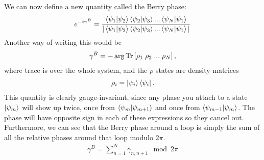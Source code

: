 \begin{center}
\end{center}
We can now define a new quantity called the Berry phase:
\begin{align}\label{berry1}
    e^{-i \gamma^{B}} = \frac{\braket{\psi_1|\psi_2}\braket{\psi_2|\psi_3}...\braket{\psi_N|\psi_1}}{|\braket{\psi_1|\psi_2}\braket{\psi_2|\psi_3}...\braket{\psi_N|\psi_1}|}
\end{align}
Another way of writing this would be
\begin{align}
    \gamma^{B} = -\arg \textup{Tr} \left[ \rho_{1} \;\rho_{2} \; ... \;\rho_{N} \right ],
\end{align}
where trace is over the whole system, and the $\rho$ states are density matrices
\begin{align}
    \rho_{i} = \ket{\psi_{i}}\bra{\psi_{i}}.
\end{align}
This quantity is clearly gauge-invariant, since any phase you attach to a state $\ket{\psi_m}$ will show up twice, once from $\braket{\psi_m|\psi_{m+1}}$ and once from $\braket{\psi_{m-1}|\psi_{m}}$. The phase will have opposite sign in each of these expressions so they cancel out. Furthermore, we can see that the Berry phase around a loop is simply the sum of all the relative phases around that loop modulo $2\pi$.
\begin{align}
	\gamma^B = \sum_{n=1}^N \gamma_{n,n+1} \mod 2\pi
\end{align}


